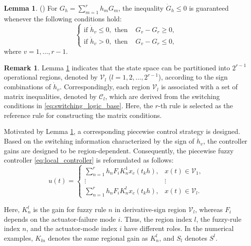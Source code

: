 \documentclass[preprint,review,fleqn,sort&compress,3p]{elsarticle}
\theoremstyle{definition} %
\theoremstyle{definition}%
\newtheorem{Lem}{Lemma}[section]
\newtheorem{rem}{Remark}[section]
\newif\ifreviewmarkup
\DeclareRobustCommand{\revadd}[1]{{\ifreviewmarkup\color{revisiongreen}\hypersetup{linkcolor=revisiongreen,citecolor=revisiongreen}\fi#1}}
\begin{document}
\begin{Lem} (\cite{wangNewApproachStability2018})
\label{lem:MFD_derivative}
For $G_h=\sum_{m=1}^r h_mG_m$, the inequality $\dot G_h\le0$ is guaranteed whenever the following conditions hold:
	\begin{equation} \label{eq:switching_logic_base}
		\begin{cases}
			\text{if } \dot{h}_v \leq 0, \text{ then } & G_{v} - G_{r} \ge 0, \\
			\text{if } \dot{h}_v > 0, \text{ then } & G_{v} - G_{r} \leq 0,
		\end{cases}
	\end{equation}
	where $v = 1, \dots, r-1$.
\end{Lem}

\begin{rem} \label{rem:Vl_definition}
	Lemma \ref{lem:MFD_derivative} indicates that the state space can be partitioned into $2^{r-1}$ operational regions, denoted by $\mathcal{V}_l$ ($l = 1,2,\dots,2^{r-1}$), according to the sign combinations of $\dot{h}_v$. Correspondingly, each region $\mathcal{V}_l$ is associated with a set of matrix inequalities, denoted by $\mathcal{C}_l$, which are derived from the switching conditions in \eqref{eq:switching_logic_base}. Here, the $r$-th rule is selected as the reference rule for constructing the matrix conditions.
\end{rem}

Motivated by Lemma \ref{lem:MFD_derivative}, a corresponding piecewise control strategy is designed. Based on the switching information characterized by the sign of $\dot h_v$, the controller gains are designed to be region-dependent. Consequently, the piecewise fuzzy controller \eqref{eq:local_controller} is reformulated as follows:
\begin{equation} \label{eq:switching_controller}
	u(t) =
	\begin{cases}
		\sum_{n=1}^{r} h_n F_i K_{n}^1 x_c(t_k h), & x(t)\in \mathcal{V}_1, \\
		\vdots & \vdots \\
		\sum_{n=1}^{r} h_n F_i K_{n}^l x_c(t_k h), & x(t)\in \mathcal{V}_l.
	\end{cases}
\end{equation}

\label{rev:M25}\revadd{Here, $K_n^l$ is the gain for fuzzy rule $n$ in derivative-sign region $\mathcal V_l$, whereas $F_i$ depends on the actuator-failure mode $i$. Thus, the region index $l$, the fuzzy-rule index $n$, and the actuator-mode index $i$ have different roles. In the numerical examples, $K_{ln}$ denotes the same regional gain as $K_n^l$, and $S_l$ denotes $S^l$.}
\end{document}
